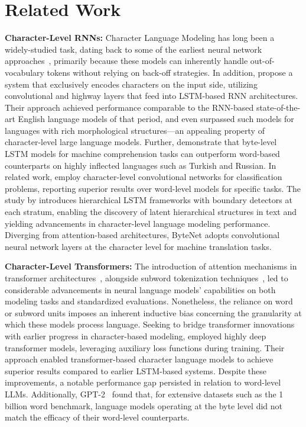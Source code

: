 \section{Related Work}
\label{section:related_work}

\textbf{Character-Level RNNs:} Character Language Modeling has long been a widely-studied task, dating back to some of the earliest neural network approaches~\citep{sutskever2011generating, mikolov2012subword, graves2013generating}, primarily because these models can inherently handle out-of-vocabulary tokens without relying on back-off strategies. In addition, \cite{kim2016character} propose a system that exclusively encodes characters on the input side, utilizing convolutional and highway layers that feed into LSTM-based RNN architectures. Their approach achieved performance comparable to the RNN-based state-of-the-art English language models of that period, and even surpassed such models for languages with rich morphological structures—an appealing property of character-level large language models. Further, \cite{kenter2018byte} demonstrate that byte-level LSTM models for machine comprehension tasks can outperform word-based counterparts on highly inflected languages such as Turkish and Russian. In related work, \cite{zhang2015character} employ character-level convolutional networks for classification problems, reporting superior results over word-level models for specific tasks. The study by \citet{chung2019hierarchical} introduces hierarchical LSTM frameworks with boundary detectors at each stratum, enabling the discovery of latent hierarchical structures in text and yielding advancements in character-level language modeling performance. Diverging from attention-based architectures, ByteNet \cite{kalchbrenner2016neural} adopts convolutional neural network layers at the character level for machine translation tasks.

\textbf{Character-Level Transformers:} The introduction of attention mechanisms in transformer architectures~\citep{vaswani2017attention}, alongside subword tokenization techniques~\citep{sennrich-etal-2016-neural}, led to considerable advancements in neural language models' capabilities on both modeling tasks and standardized evaluations. Nonetheless, the reliance on word or subword units imposes an inherent inductive bias concerning the granularity at which these models process language. Seeking to bridge transformer innovations with earlier progress in character-based modeling, \citet{al2019character} employed highly deep transformer models, leveraging auxiliary loss functions during training. Their approach enabled transformer-based character language models to achieve superior results compared to earlier LSTM-based systems. Despite these improvements, a notable performance gap persisted in relation to word-level LLMs. Additionally, GPT-2~\citep{radfordgpt2} found that, for extensive datasets such as the 1 billion word benchmark, language models operating at the byte level did not match the efficacy of their word-level counterparts.

